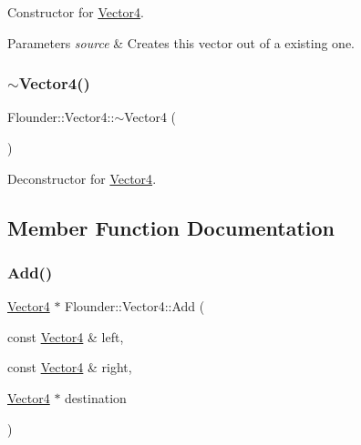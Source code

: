 Constructor for \hyperlink{class_flounder_1_1_vector4}{Vector4}. 


\begin{DoxyParams}{Parameters}
{\em source} & Creates this vector out of a existing one. \\
\hline
\end{DoxyParams}
\mbox{\label{class_flounder_1_1_vector4_ab7e0e61d7bd628476466b5baef03d570}} 
\subsubsection{\texorpdfstring{$\sim$\+Vector4()}{~Vector4()}}
{\footnotesize\ttfamily Flounder\+::\+Vector4\+::$\sim$\+Vector4 (\begin{DoxyParamCaption}{ }\end{DoxyParamCaption})}



Deconstructor for \hyperlink{class_flounder_1_1_vector4}{Vector4}. 



\subsection{Member Function Documentation}
\mbox{\label{class_flounder_1_1_vector4_a8fb6b43e4e7b1fc83d803d927d3a1d2a}} 
\subsubsection{\texorpdfstring{Add()}{Add()}}
{\footnotesize\ttfamily \hyperlink{class_flounder_1_1_vector4}{Vector4} $\ast$ Flounder\+::\+Vector4\+::\+Add (\begin{DoxyParamCaption}\item[{const \hyperlink{class_flounder_1_1_vector4}{Vector4} \&}]{left,  }\item[{const \hyperlink{class_flounder_1_1_vector4}{Vector4} \&}]{right,  }\item[{\hyperlink{class_flounder_1_1_vector4}{Vector4} $\ast$}]{destination }\end{DoxyParamCaption})\hspace{0.3cm}{\ttfamily [static]}}




